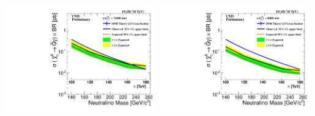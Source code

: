 \begin{minipage}{0.90\linewidth}
\begin{center}
\includegraphics[width=0.49\textwidth,height=0.5\textwidth]{THESISPLOTS/Neutralino_CrosSecVsMass_Exclusion_limit_11000.pdf}
\includegraphics[width=0.49\textwidth,height=0.5\textwidth]{THESISPLOTS/Neutralino_CrosSecVsMass_Exclusion_limit_6000.pdf}
\label{fig:limits}
\end{center}
\end{minipage}
\paragraph*{}\mbox{}\\


